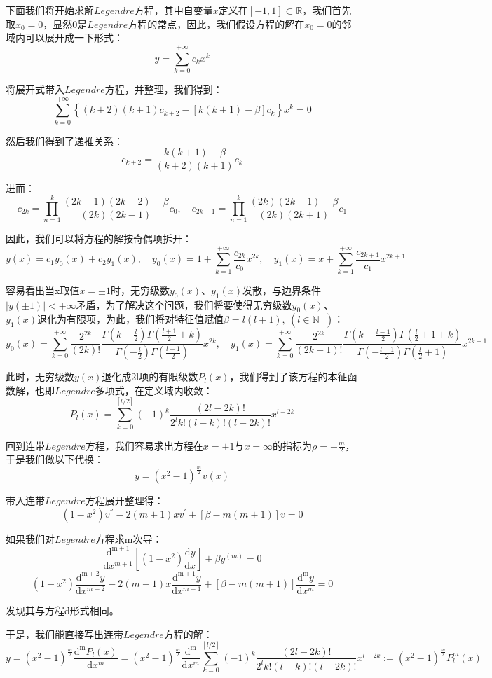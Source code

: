下面我们将开始求解$Legendre$方程，其中自变量$x$定义在$[-1,1] \subset \mathbb{R}$，我们首先取$x_0=0$，显然0是$Legendre$方程的常点，因此，我们假设方程的解在$x_0=0$的邻域内可以展开成一下形式：
\[y=\sum_{k=0}^{+\infty}c_kx^k\]

将展开式带入$Legendre$方程，并整理，我们得到：
\[\sum_{k=0}^{+\infty} \left \{ (k+2)(k+1)c_{k+2}-[k(k+1)-\beta]c_k \right \}x^k=0\]

然后我们得到了递推关系：
\[c_{k+2}=\frac{k(k+1)-\beta}{(k+2)(k+1)}c_k\]

进而：
\[c_{2k}=\prod_{n=1}^{k}\frac{(2k-1)(2k-2)-\beta}{(2k)(2k-1)}c_0, \quad c_{2k+1}=\prod_{n=1}^{k}\frac{(2k)(2k-1)-\beta}{(2k)(2k+1)}c_1\]

因此，我们可以将方程的解按奇偶项拆开：
\[y(x)=c_1y_0(x)+c_2y_1(x), \quad y_0(x)=1+\sum_{k=1}^{+\infty}\frac{c_{2k}}{c_0}x^{2k}, \quad y_1(x)=x+\sum_{k=1}^{+\infty}\frac{c_{2k+1}}{c_1}x^{2k+1}\]

容易看出当x取值$x= \pm 1$时，无穷级数$y_0(x)$、$y_1(x)$发散，与边界条件$|y(\pm 1)|< +\infty$矛盾，为了解决这个问题，我们将要使得无穷级数$y_0(x)$、$y_1(x)$退化为有限项，为此，我们将对特征值赋值$\beta=l(l+1), \ (l \in \mathbb{N}_{+})$：
\[y_0(x)=\sum_{k=0}^{+\infty}\frac{2^{2k}}{(2k)!}\frac{\Gamma(k-\frac{l}{2})\Gamma(\frac{l+1}{2}+k)}{\Gamma(-\frac{l}{2})\Gamma(\frac{l+1}{2})}x^{2k}, \quad y_1(x)=\sum_{k=0}^{+\infty}\frac{2^{2k}}{(2k+1)!}\frac{\Gamma(k-\frac{l-1}{2})\Gamma(\frac{l}{2}+1+k)}{\Gamma(-\frac{l-1}{2})\Gamma(\frac{l}{2}+1)}x^{2k+1}\]

此时，无穷级数$y(x)$退化成2l项的有限级数$P_l(x)$，我们得到了该方程的本征函数解，也即$Legendre$多项式，在定义域内收敛：
\[P_l(x)=\sum_{k=0}^{[l/2]}(-1)^k \frac{(2l-2k)!}{2^l k! (l-k)!(l-2k)!}x^{l-2k}\]

回到连带$Legendre$方程，我们容易求出方程在$x= \pm 1$与$x=\infty$的指标为$\rho= \pm \frac{m}{2}$，于是我们做以下代换：
\[y=(x^2-1)^{\frac{m}{2}}v(x)\]

带入连带$Legendre$方程展开整理得：
\[(1-x^2)v^{''}-2(m+1)xv^{'}+[\beta-m(m+1)]v=0 \tag{d}\]

如果我们对$Legendre$方程求m次导：
\[\frac{\mathrm{d^{m+1}}}{\mathrm{d}{x^{m+1}}} \left [(1-x^2) \frac{\mathrm{d} y}{\mathrm{d}{x}} \right ]+\beta y^{(m)}=0\]
\[(1-x^2)\frac{\mathrm{d^{m+2}}y}{\mathrm{d}{x^{m+2}}}-2(m+1)x\frac{\mathrm{d^{m+1}}y}{\mathrm{d}{x^{m+1}}}+[\beta-m(m+1)]\frac{\mathrm{d^{m}}y}{\mathrm{d}{x^{m}}}=0\]

发现其与方程d形式相同。

于是，我们能直接写出连带$Legendre$方程的解：
\[y=(x^2-1)^{\frac{m}{2}}\frac{\mathrm{d^{m}}P_l(x)}{\mathrm{d}{x^{m}}}=(x^2-1)^{\frac{m}{2}}\frac{\mathrm{d^{m}}}{\mathrm{d}{x^{m}}}\sum_{k=0}^{[l/2]}(-1)^k \frac{(2l-2k)!}{2^l k! (l-k)!(l-2k)!}x^{l-2k}:=(x^2-1)^{\frac{m}{2}}P^m_l(x)\]


